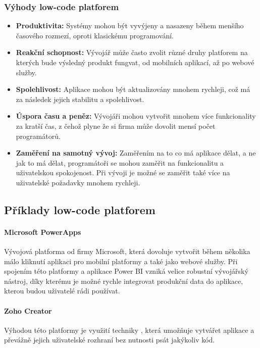 \subsubsection{Výhody low-code platforem}
\begin{itemize}
  \item \textbf{Produktivita:} Systémy mohou být vyvýjeny a nasazeny během menšího časového rozmezí, oproti klasickému programování. \cite{low-code-accelerate}
  \item \textbf{Reakční schopnost:} Vývojář může často zvolit různé druhy platforem na kterých bude výsledný produkt fungvat, od mobilních aplikací, až po webové služby. \cite{low-code-accelerate}
  \item \textbf{Spolehlivost:} Aplikace mohou být aktualizovány mnohem rychleji, což má za následek jejich stabilitu a spolehlivost. \cite{low-code-accelerate}
  \item \textbf{Úspora času a peněz:} Vývojáři mohou vytvořit mnohem více funkcionality za kratší čas, z čehož plyne že si firma může dovolit mensí počet programátorů. \cite{low-code-accelerate}
  \item \textbf{Zaměření na samotný vývoj:} Zaměřením na to co má aplikace dělat, a ne jak to má dělat, programátoři se mohou zaměřit na funkcionalitu a uživatelskou spokojenost. Při vývoji je možné se zaměřit také více na uživatelské požadavky mnohem rychleji. \cite{low-code-accelerate}
\end{itemize}

\subsection{Příklady low-code platforem}
\paragraph{Microsoft PowerApps} Vývojová platforma od firmy Microsoft, která dovoluje vytvořit během několika málo kliknutí aplikaci pro mobilní platformy a také jako webové služby. Při spojením této platformy a aplikace Power BI vzniká velice robustní vývojářský nástroj, díky kterému je možné rychle integrovat produkční data do aplikace, kterou budou uživatelé rádi používat. \cite{pcmag-no-coding}
\paragraph{Zoho Creator} Výhodou této platformy je využití techniky , která umožňuje vytvářet aplikace a převážně jejich uživatelské rozhraní bez nutnosti psát jakýkoliv kód. \cite{zoho-review}
